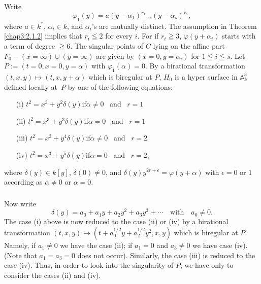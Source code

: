 \subsubsection{}\label{chap3:2.9.1}
Write
$$
\varphi_{1}(y)=a(y-\alpha_{1})^{r_{1}}\ldots(y-\alpha_{s})^{r_{s}},
$$
where $a\in k^{\ast}$, $\alpha_{i}\in k$, and $\alpha_{i}$'s are
mutually distinct. The assumption in Theorem \ref{chap3:2.1.2} implies
that $r_{i}\leqq 2$ for every $i$. For if $r_{i}\geqq 3$,
$\varphi(y+\alpha_{i})$ starts with a term of degree $\geqq 6$. The
singular points of $C$ lying on the affine part $F_{0}-(x=\infty)\cup
(y=\infty)$ are given by $(x=0,y=\alpha_{i})$ for $1\leqq i\leqq
s$. Let $P:=(t=0,x=0,y=\alpha)$ with $\varphi_{1}(\alpha)=0$. By a
birational transformation $(t,x,y)\mapsto (t,x,y+\alpha)$ which is
biregular at $P$, $H_{0}$ is a hyper surface in $\mathbb{A}^{3}_{k}$
defined locally at\pageoriginale\ $P$ by one of the following
equations:
\begin{itemize}
\item[(i)] $t^{2}=x^{3}+y^{2}\delta(y)$\quad if\quad $\alpha\neq
  0$ \ and \ $r=1$

\item[(ii)] $t^{2}=x^{3}+y^{3}\delta(y)$\quad if\quad $\alpha=
  0$ \ and \ $r=1$

\item[(iii)] $t^{2}=x^{3}+y^{4}\delta(y)$\quad if\quad $\alpha\neq
  0$ \ and \ $r=2$

\item[(iv)] $t^{2}=x^{3}+y^{5}\delta(y)$\quad if\quad $\alpha=
  0$ \ and \ $r=2$,
\end{itemize}
where $\delta(y)\in k[y]$, $\delta(0)\neq 0$, and
$\delta(y)y^{2r+\epsilon}=\varphi(y+\alpha)$ with $\epsilon=0$ or $1$
according as $\alpha\neq 0$ or $\alpha=0$.

\subsubsection{}\label{chap3:2.9.2}
Now write
$$
\delta(y)=a_{0}+a_{1}y+a_{2}y^{2}+a_{3}y^{3}+\cdots\quad\text{with}\quad
a_{0}\neq 0.
$$
The case (i) above is now reduced to the case (ii) or (iv) by a
birational transformation $(t,x,y)\mapsto
(t+a_{0}^{1/2}y+a^{1/2}_{2}y^{2},x,y)$ which is biregular at
$P$. Namely, if $a_{1}\neq 0$ we have the case (ii); if $a_{1}=0$ and
$a_{3}\neq 0$ we have case (iv). (Note that $a_{1}=a_{3}=0$ does not
occur). Similarly, the case (iii) is reduced to the case (iv). Thus,
in order to look into the singularity of $P$, we have only to consider
the cases (ii) and (iv).


